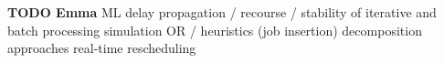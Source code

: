 \documentclass{article}
\begin{document}
\begin{mdframed}
{\bf TODO Emma}         ML
        delay propagation / recourse / stability of iterative and batch processing
        simulation
        OR / heuristics (job insertion)
        decomposition approaches
        real-time rescheduling

\end{mdframed}



\end{document}
